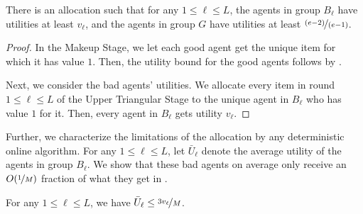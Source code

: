 \documentclass[11pt,letterpaper]{article}
\newcommand{\utility}{U}
\begin{document}
\begin{lemma}
	\label{lem:hardness-nashian-optimal}
	There is an allocation such that for any $1 \le \ell \le L$, the agents in group $B_\ell$ have utilities at least $v_\ell$, and the agents in group $G$ have utilities at least $\nicefrac{(e-2)}{(e-1)}$.
\end{lemma}

\begin{proof}
	In the Makeup Stage, we let each good agent get the unique item for which it has value $1$.
	Then, the utility bound for the good agents follows by .
	
	Next, we consider the bad agents' utilities. 
	We allocate every item in round $1 \le \ell \le L$ of the Upper Triangular Stage to the unique agent in $B_\ell$ who has value $1$ for it.
	Then, every agent in $B_\ell$ gets utility $v_\ell$.
\end{proof}







Further, we characterize the limitations of the allocation by any deterministic online algorithm.
For any $1 \le \ell \le L$, let $\bar{\utility}_\ell$ denote the average utility of the agents in group $B_\ell$.
We show that these bad agents on average only receive an $O(\nicefrac{1}{M})$ fraction of what they get in .



\begin{lemma}
	\label{lem:hardness-nashian-algorithm}
	For any $1 \le \ell \le L$, we have $\bar{\utility}_\ell \le \nicefrac{3 v_\ell}{M}$.
\end{lemma}
\end{document}
